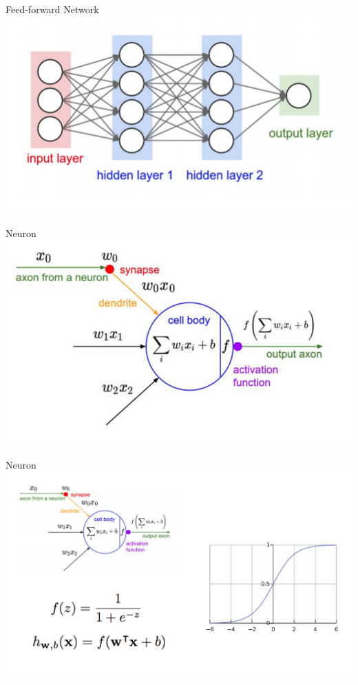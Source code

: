 \begin{frame}{Feed-forward Network}
\centering
\includegraphics[scale=0.27]{figures/ff/network.png}
\end{frame}

\begin{frame}{Neuron}
\centering
\includegraphics[scale=0.4]{figures/ff/neuron.png}
\end{frame}

\begin{frame}{Neuron}
\centering
\includegraphics[scale=0.3]{figures/ff/neuron2.png}
\end{frame}

